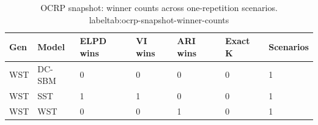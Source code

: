 \begin{table}[!h]
\centering
\caption{OCRP snapshot: winner counts across one-repetition scenarios.\\label{tab:ocrp-snapshot-winner-counts}}
\centering
\begin{tabular}[t]{lllllll}
\toprule
Gen & Model & ELPD wins & VI wins & ARI wins & Exact K & Scenarios\\
\midrule
WST & DC-SBM & 0 & 0 & 0 & 0 & 1\\
WST & SST & 1 & 1 & 0 & 0 & 1\\
WST & WST & 0 & 0 & 1 & 0 & 1\\
\bottomrule
\end{tabular}
\end{table}
